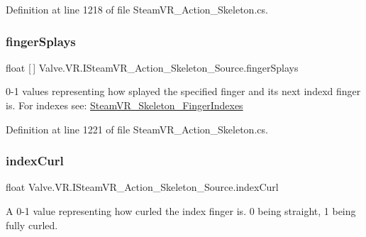 Definition at line 1218 of file Steam\+V\+R\+\_\+\+Action\+\_\+\+Skeleton.\+cs.

\mbox{\label{interface_valve_1_1_v_r_1_1_i_steam_v_r___action___skeleton___source_a4236e5530f9571b5afc65e299344f1c9}} 
\subsubsection{\texorpdfstring{fingerSplays}{fingerSplays}}
{\footnotesize\ttfamily float \mbox{[}$\,$\mbox{]} Valve.\+V\+R.\+I\+Steam\+V\+R\+\_\+\+Action\+\_\+\+Skeleton\+\_\+\+Source.\+finger\+Splays\hspace{0.3cm}{\ttfamily [get]}}



0-\/1 values representing how splayed the specified finger and it\textquotesingle{}s next index\textquotesingle{}d finger is. For indexes see\+: \mbox{\hyperlink{class_valve_1_1_v_r_1_1_steam_v_r___skeleton___finger_indexes}{Steam\+V\+R\+\_\+\+Skeleton\+\_\+\+Finger\+Indexes}} 



Definition at line 1221 of file Steam\+V\+R\+\_\+\+Action\+\_\+\+Skeleton.\+cs.

\mbox{\label{interface_valve_1_1_v_r_1_1_i_steam_v_r___action___skeleton___source_a8ce410f03818d0f9c6110578e1ad1464}} 
\subsubsection{\texorpdfstring{indexCurl}{indexCurl}}
{\footnotesize\ttfamily float Valve.\+V\+R.\+I\+Steam\+V\+R\+\_\+\+Action\+\_\+\+Skeleton\+\_\+\+Source.\+index\+Curl\hspace{0.3cm}{\ttfamily [get]}}



A 0-\/1 value representing how curled the index finger is. 0 being straight, 1 being fully curled. 



